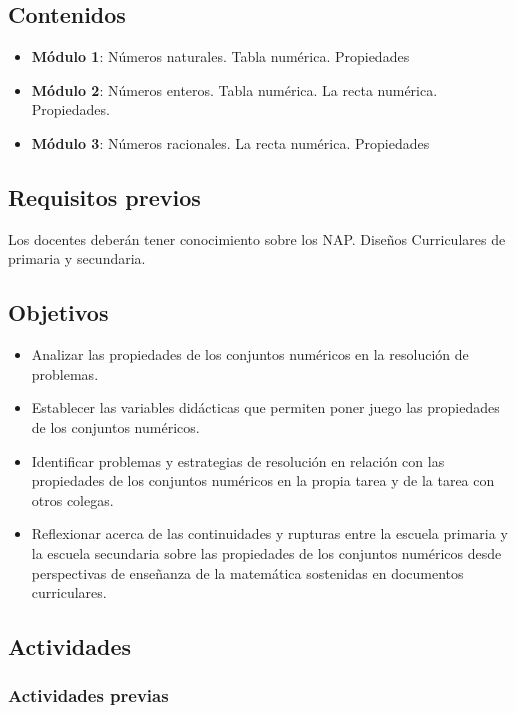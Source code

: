 \subsection{Contenidos}

\begin{itemize}
	\item \textbf{Módulo 1}: Números naturales. Tabla numérica. Propiedades
	\item \textbf{Módulo 2}: Números enteros. Tabla numérica. La recta numérica. Propiedades.
	\item \textbf{Módulo 3}: Números racionales. La recta numérica. Propiedades
\end{itemize}

\subsection{Requisitos previos}

Los docentes deberán tener conocimiento sobre los NAP. Diseños Curriculares de primaria y secundaria.

\subsection{Objetivos}

\begin{itemize}
	\item Analizar las propiedades de los conjuntos numéricos en la resolución de problemas.
	\item Establecer las variables didácticas que permiten poner juego las propiedades de los conjuntos numéricos.
	\item Identificar problemas y estrategias de resolución en relación con las propiedades de los conjuntos numéricos en la propia tarea y de la tarea con otros colegas.
	\item Reflexionar acerca de las continuidades y rupturas entre la escuela primaria y la escuela secundaria sobre las propiedades de los conjuntos numéricos desde perspectivas de enseñanza de la matemática sostenidas en documentos curriculares.
\end{itemize}

\subsection{Actividades}

\subsubsection{Actividades previas}


